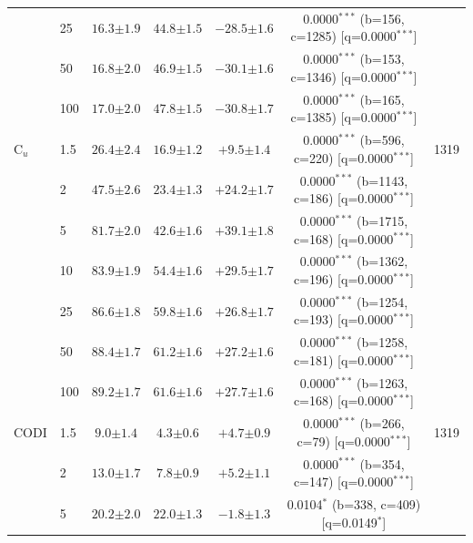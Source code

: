 \begin{table}[h!]
\begin{tabular}{l l cccc c}
 & 25 & $16.3 {\scriptstyle \pm 1.9}$ & $44.8 {\scriptstyle \pm 1.5}$ & $-28.5 {\scriptstyle \pm 1.6}$ & 0.0000$^{***}$ (b=156, c=1285) [q=0.0000$^{***}$] &  \\
 & 50 & $16.8 {\scriptstyle \pm 2.0}$ & $46.9 {\scriptstyle \pm 1.5}$ & $-30.1 {\scriptstyle \pm 1.6}$ & 0.0000$^{***}$ (b=153, c=1346) [q=0.0000$^{***}$] &  \\
 & 100 & $17.0 {\scriptstyle \pm 2.0}$ & $47.8 {\scriptstyle \pm 1.5}$ & $-30.8 {\scriptstyle \pm 1.7}$ & 0.0000$^{***}$ (b=165, c=1385) [q=0.0000$^{***}$] &  \\
\midrule
C$_u$ & 1.5 & $26.4 {\scriptstyle \pm 2.4}$ & $16.9 {\scriptstyle \pm 1.2}$ & $+9.5 {\scriptstyle \pm 1.4}$ & 0.0000$^{***}$ (b=596, c=220) [q=0.0000$^{***}$] & 1319 \\
 & 2 & $47.5 {\scriptstyle \pm 2.6}$ & $23.4 {\scriptstyle \pm 1.3}$ & $+24.2 {\scriptstyle \pm 1.7}$ & 0.0000$^{***}$ (b=1143, c=186) [q=0.0000$^{***}$] &  \\
 & 5 & $81.7 {\scriptstyle \pm 2.0}$ & $42.6 {\scriptstyle \pm 1.6}$ & $+39.1 {\scriptstyle \pm 1.8}$ & 0.0000$^{***}$ (b=1715, c=168) [q=0.0000$^{***}$] &  \\
 & 10 & $83.9 {\scriptstyle \pm 1.9}$ & $54.4 {\scriptstyle \pm 1.6}$ & $+29.5 {\scriptstyle \pm 1.7}$ & 0.0000$^{***}$ (b=1362, c=196) [q=0.0000$^{***}$] &  \\
 & 25 & $86.6 {\scriptstyle \pm 1.8}$ & $59.8 {\scriptstyle \pm 1.6}$ & $+26.8 {\scriptstyle \pm 1.7}$ & 0.0000$^{***}$ (b=1254, c=193) [q=0.0000$^{***}$] &  \\
 & 50 & $88.4 {\scriptstyle \pm 1.7}$ & $61.2 {\scriptstyle \pm 1.6}$ & $+27.2 {\scriptstyle \pm 1.6}$ & 0.0000$^{***}$ (b=1258, c=181) [q=0.0000$^{***}$] &  \\
 & 100 & $89.2 {\scriptstyle \pm 1.7}$ & $61.6 {\scriptstyle \pm 1.6}$ & $+27.7 {\scriptstyle \pm 1.6}$ & 0.0000$^{***}$ (b=1263, c=168) [q=0.0000$^{***}$] &  \\
\midrule
CODI & 1.5 & $9.0 {\scriptstyle \pm 1.4}$ & $4.3 {\scriptstyle \pm 0.6}$ & $+4.7 {\scriptstyle \pm 0.9}$ & 0.0000$^{***}$ (b=266, c=79) [q=0.0000$^{***}$] & 1319 \\
 & 2 & $13.0 {\scriptstyle \pm 1.7}$ & $7.8 {\scriptstyle \pm 0.9}$ & $+5.2 {\scriptstyle \pm 1.1}$ & 0.0000$^{***}$ (b=354, c=147) [q=0.0000$^{***}$] &  \\
 & 5 & $20.2 {\scriptstyle \pm 2.0}$ & $22.0 {\scriptstyle \pm 1.3}$ & $-1.8 {\scriptstyle \pm 1.3}$ & 0.0104$^{*}$ (b=338, c=409) [q=0.0149$^{*}$] &  \\

\end{tabular}
\end{table}
